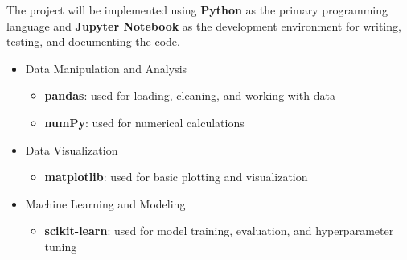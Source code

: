 The project will be implemented using \textbf{Python} as the primary programming language and \textbf{Jupyter Notebook} as the development environment for writing, testing, and documenting the code.

\begin{itemize}
    \item Data Manipulation and Analysis
    \begin{itemize}
        \item \textbf{pandas}: used for loading, cleaning, and working with data
        \item \textbf{numPy}: used for numerical calculations
    \end{itemize}
    \item Data Visualization
    \begin{itemize}
        \item \textbf{matplotlib}: used for basic plotting and visualization
    \end{itemize}
    \item Machine Learning and Modeling
    \begin{itemize}
        \item \textbf{scikit-learn}: used for model training, evaluation, and hyperparameter tuning
    \end{itemize}
\end{itemize}
